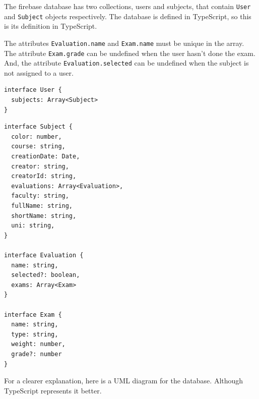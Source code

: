 The firebase database has two collections, users and subjects, that contain \texttt{User} and \texttt{Subject} objects respectively. The database is defined in TypeScript, so this is its definition in TypeScript.

The attributes \texttt{Evaluation.name} and \texttt{Exam.name} must be unique in the array. The attribute \texttt{Exam.grade} can be undefined when the user hasn't done the exam. And, the attribute \texttt{Evaluation.selected} can be undefined when the subject is not assigned to a user.

\vfill
\begin{verbatim}
interface User {
  subjects: Array<Subject>
}
\end{verbatim}

\vfill


\begin{verbatim}
interface Subject {
  color: number,
  course: string,
  creationDate: Date,
  creator: string,
  creatorId: string,
  evaluations: Array<Evaluation>,
  faculty: string,
  fullName: string,
  shortName: string,
  uni: string,
}

interface Evaluation {
  name: string,
  selected?: boolean,
  exams: Array<Exam>
}

interface Exam {
  name: string,
  type: string,
  weight: number,
  grade?: number
}
\end{verbatim}


\clearpage\newpage\noindent
For a clearer explanation, here is a UML diagram for the database. Although TypeScript represents it better. %

